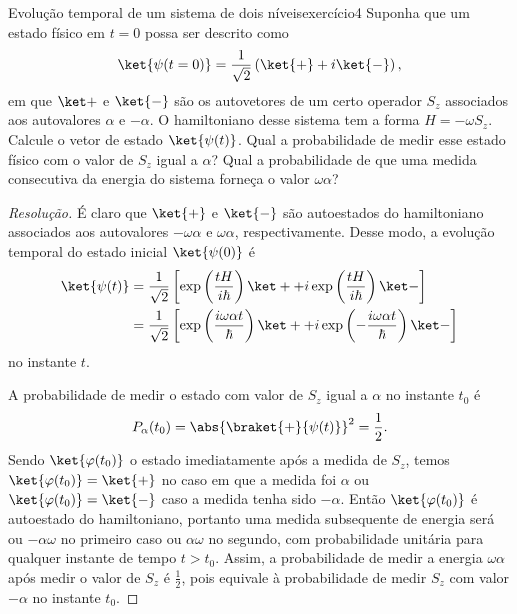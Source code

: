 \begin{exercício}{Evolução temporal de um sistema de dois níveis}{exercício4}
    Suponha que um estado físico em \(t = 0\) possa ser descrito como
    \begin{equation*}
        \ket{\psi(t = 0)} = \frac{1}{\sqrt{2}}\left(\ket{+} + i \ket{-}\right),
    \end{equation*}
    em que \(\ket+\) e \(\ket{-}\) são os autovetores de um certo operador \(S_z\) associados aos autovalores \(\alpha\) e \(-\alpha\). O hamiltoniano desse sistema tem a forma \(H = - \omega S_z\). Calcule o vetor de estado \(\ket{\psi(t)}\). Qual a probabilidade de medir esse estado físico com o valor de \(S_z\) igual a \(\alpha\)? Qual a probabilidade de que uma medida consecutiva da energia do sistema forneça o valor \(\omega \alpha\)?
\end{exercício}
\begin{proof}[Resolução]
    É claro que \(\ket{+}\) e \(\ket{-}\) são autoestados do hamiltoniano associados aos autovalores \(- \omega \alpha\) e \(\omega \alpha\), respectivamente. Desse modo, a evolução temporal do estado inicial \(\ket{\psi(0)}\) é
    \begin{align*}
        \ket{\psi(t)} &= \frac1{\sqrt{2}}\left[\exp\left(\frac{tH}{i\hbar}\right)\ket+ + i \exp\left(\frac{tH}{i\hbar}\right)\ket-\right]\\
                      &= \frac1{\sqrt{2}}\left[\exp\left(\frac{i \omega \alpha t}{\hbar}\right)\ket+ + i\exp\left(-\frac{i\omega \alpha t}{\hbar}\right)\ket-\right]
    \end{align*}
    no instante \(t\).

    A probabilidade de medir o estado com valor de \(S_z\) igual a \(\alpha\) no instante \(t_0\) é
    \begin{equation*}
        P_{\alpha}(t_0) = \abs{\braket{+}{\psi(t)}}^2 = \frac12.
    \end{equation*}
    Sendo \(\ket{\varphi(t_0)}\) o estado imediatamente após a medida de \(S_z\), temos \(\ket{\varphi(t_0)} = \ket{+}\) no caso em que a medida foi \(\alpha\) ou \(\ket{\varphi(t_0)} = \ket{-}\) caso a medida tenha sido \(-\alpha\). Então \(\ket{\varphi(t_0)}\) é autoestado do hamiltoniano, portanto uma medida subsequente de energia será ou \(-\alpha \omega\) no primeiro caso ou \(\alpha \omega\) no segundo, com probabilidade unitária para qualquer instante de tempo \(t > t_0\). Assim, a probabilidade de medir a energia \(\omega \alpha\) após medir o valor de \(S_z\) é \(\frac12\), pois equivale à probabilidade de medir \(S_z\) com valor \(-\alpha\) no instante \(t_0\).
\end{proof}
